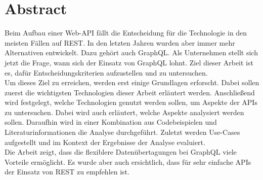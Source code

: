 \chapter*{Abstract}

Beim Aufbau einer Web-API fällt die Entscheidung für die Technologie in den meisten Fällen auf REST. In den letzten Jahren wurden aber immer mehr Alternativen entwickelt. Dazu gehört auch GraphQL. Als Unternehmen stellt sich jetzt die Frage, wann sich der Einsatz von GraphQL lohnt. Ziel dieser Arbeit ist es, dafür Entscheidungskriterien aufzustellen und zu untersuchen.
\\
Um dieses Ziel zu erreichen, werden erst einige Grundlagen erforscht. Dabei sollen zuerst die wichtigsten Technologien dieser Arbeit erläutert werden. Anschließend wird festgelegt, welche Technologien genutzt werden sollen, um Aspekte der APIs zu untersuchen. Dabei wird auch erläutert, welche Aspekte analysiert werden sollen. Daraufhin wird in einer Kombination aus Codebeispielen und Literaturinformationen die Analyse durchgeführt. Zuletzt werden Use-Cases aufgestellt und im Kontext der Ergebnisse der Analyse evaluiert.
\\
Die Arbeit zeigt, dass die flexiblere Datenübertagungen bei GraphQL viele Vorteile ermöglicht. Es wurde aber auch ersichtlich, dass für sehr einfache APIs der Einsatz von REST zu empfehlen ist.

